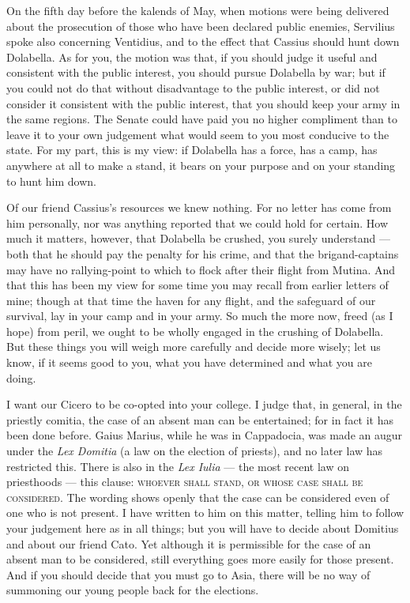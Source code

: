 

 On the fifth day before the kalends of May, when motions were being delivered about the prosecution of those who have been declared public enemies, Servilius spoke also concerning Ventidius, and to the effect that Cassius should hunt down Dolabella. As for you, the motion was that, if you should judge it useful and consistent with the public interest, you should pursue Dolabella by war; but if you could not do that without disadvantage to the public interest, or did not consider it consistent with the public interest, that you should keep your army in the same regions. The Senate could have paid you no higher compliment than to leave it to your own judgement what would seem to you most conducive to the state. For my part, this is my view: if Dolabella has a force, has a camp, has anywhere at all to make a stand, it bears on your purpose and on your standing to hunt him down.

 Of our friend Cassius's resources we knew nothing. For no letter has come from him personally, nor was anything reported that we could hold for certain. How much it matters, however, that Dolabella be crushed, you surely understand --- both that he should pay the penalty for his crime, and that the brigand-captains may have no rallying-point to which to flock after their flight from Mutina. And that this has been my view for some time you may recall from earlier letters of mine; though at that time the haven for any flight, and the safeguard of our survival, lay in your camp and in your army. So much the more now, freed (as I hope) from peril, we ought to be wholly engaged in the crushing of Dolabella. But these things you will weigh more carefully and decide more wisely; let us know, if it seems good to you, what you have determined and what you are doing.

 I want our Cicero to be co-opted into your college. I judge that, in general, in the priestly comitia, the case of an absent man can be entertained; for in fact it has been done before. Gaius Marius, while he was in Cappadocia, was made an augur under the \textit{Lex Domitia} (a law on the election of priests), and no later law has restricted this. There is also in the \textit{Lex Iulia} --- the most recent law on priesthoods --- this clause: \textsc{whoever shall stand, or whose case shall be considered}. The wording shows openly that the case can be considered even of one who is not present. I have written to him on this matter, telling him to follow your judgement here as in all things; but you will have to decide about Domitius and about our friend Cato. Yet although it is permissible for the case of an absent man to be considered, still everything goes more easily for those present. And if you should decide that you must go to Asia, there will be no way of summoning our young people back for the elections.

